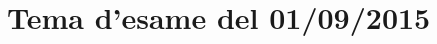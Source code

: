 \documentclass[main.tex]{subfiles}
\begin{document}
\section{Tema d'esame del 01/09/2015}


\clearpage

\clearpage

\end{document}

